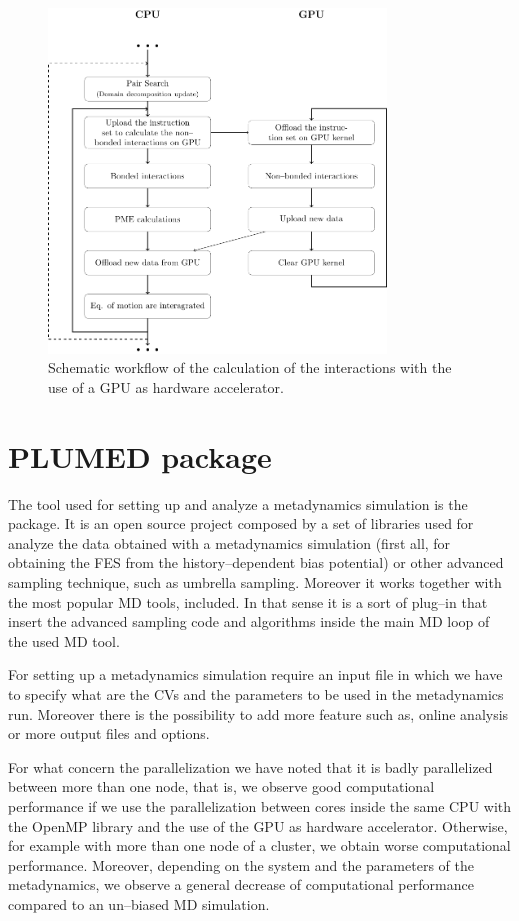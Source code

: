 \begin{figure}[h!t]
	\centering
	\includegraphics[width=0.8\textwidth]{./img/Schemi/GPU}
	\caption{Schematic workflow of the calculation of the interactions with the use of a GPU as hardware accelerator.}
	\label{fig:GPU}
\end{figure}


\section{PLUMED package}
The tool used for setting up and analyze a metadynamics simulation is the \href{http://www.plumed.org}{\plumed} package. It is an open source project composed by a set of libraries used for analyze the data obtained with a metadynamics simulation (first all, for obtaining the \ac{FES} from the history--dependent bias potential) or other advanced sampling technique, such as umbrella sampling. Moreover it works together with the most popular \ac{MD} tools, \gromacs included. In that sense it is a sort of plug--in that insert the advanced sampling code and algorithms inside the main \ac{MD} loop of the used \ac{MD} tool.

For setting up a metadynamics simulation \plumed require an input file in which we have to specify what are the \acp{CV} and the parameters to be used in the metadynamics run. Moreover there is the possibility to add more feature such as, online analysis or more output files and options.

For what concern the parallelization we have noted that it is badly parallelized between more than one node, that is, we observe good computational performance if we use the parallelization between cores inside the same CPU with the OpenMP library and the use of the GPU as hardware accelerator. Otherwise, for example with more than one node of a cluster, we obtain worse computational performance. Moreover, depending on the system and the parameters of the metadynamics, we observe a general decrease of computational performance compared to an un--biased \ac{MD} simulation.

